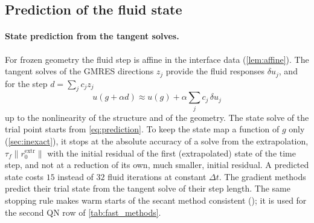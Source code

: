 \documentclass[11pt,a4paper]{article}
\theoremstyle{definition}
\theoremstyle{remark}
\begin{document}
\subsection{Prediction of the fluid state}\label{sec:state_prediction}

\paragraph{State prediction from the tangent solves.} For frozen geometry the fluid step is affine
in the interface data (\cref{lem:affine}). The tangent solves of the GMRES directions $z_j$ provide
the fluid responses $\delta u_j$, and for the step $d=\sum_jc_jz_j$
\begin{equation}\label{eq:prediction}
  u(g+\alpha d)\approx u(g)+\alpha\sum_jc_j\,\delta u_j
\end{equation}
up to the nonlinearity of the structure and of the geometry. The state solve of the trial point
starts from \eqref{eq:prediction}. To keep the state map a function of $g$ only
(\cref{sec:inexact}), it stops at the absolute accuracy of a solve from the extrapolation,
$\tau_f\|r_0^{\mathrm{extr}}\|$ with the initial residual of the first (extrapolated) state of the
time step, and not at a reduction of its own, much smaller, initial residual. A predicted state
costs $15$ instead of $32$ fluid iterations at constant $\Delta t$. The gradient methods predict
their trial state from the tangent solve of their step length. The same stopping rule makes warm
starts of the secant method consistent (); it is used for the
second QN row of \cref{tab:fast_methods}.
\end{document}
